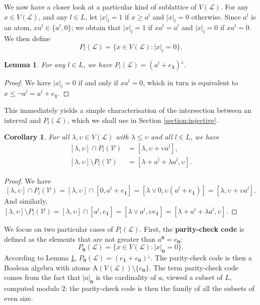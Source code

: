 \documentclass[a4paper, 11pt]{article}
\theoremstyle{plain}
\newtheorem{corollary}  [theorem]{Corollary}
\newtheorem{lemma}      [theorem]{Lemma}
\theoremstyle{definition}
\newcommand{\Define}    [1] {\textbf{#1}}
\newcommand{\join}      {\lor}
\newcommand{\zero}      {\mathbf{0}}
\newcommand{\one}       {\mathbf{1}}
\newcommand{\Atoms}     {\mathrm{A}}
\begin{document}
We now have a closer look at a particular kind of sublattice of $V( \mathcal{L} )$. For any $x \in V( \mathcal{L} )$, and any $l \in L$, let $|x|_l = 1$ if $x \ge a^l$ and $|x|_l = 0$ otherwise. Since $a^l$ is an atom, $x a^l \in \{ a^l, 0 \}$; we obtain that $|x|_l =1$ if $xa^l = a^l$ and $|x|_l = 0$ if $x a^l = 0$. We then define
\[
    P_l( \mathcal{L} ) = \{ x \in V( \mathcal{L} ) : |x|_l = 0 \}.
\]

\begin{lemma} \label{lemma:Pl}
For any $l \in L$, we have $P_l( \mathcal{L} ) = ( a^l + e_\one )^\downarrow$.
\end{lemma}

\begin{proof}
We have $|x|_l = 0$ if and only if $x a^l = 0$, which in turn is equivalent to $x \le \neg a^l = a^l + e_\one$.
\end{proof}

This immediately yields a simple characterisation of the intersection between an interval and $P_l( \mathcal{L} )$, which we shall use in Section \ref{section:injective}.

\begin{corollary} \label{corollary:Pl}
For all $\lambda, \upsilon \in V(\mathcal{L})$ with $\lambda \le \upsilon$ and all $l \in L$, we have
\begin{align}
    \label{equation:P1a}
    [ \lambda, \upsilon ] \cap P_l( \mathcal{V} ) &= [ \lambda, \upsilon + \upsilon a^l ], \\
    \label{equation:P1b}
    [ \lambda, \upsilon ] \setminus P_l( \mathcal{V} ) &= [ \lambda + a^l + \lambda a^l, \upsilon ].
\end{align}
\end{corollary}

\begin{proof}
We have
\[
    [ \lambda, \upsilon ] \cap P_l( \mathcal{V} ) = [ \lambda, \upsilon ] \cap [ 0, a^l + e_\one ] 
    = [ \lambda \join 0, \upsilon ( a^l + e_\one ) ] 
    = [ \lambda, \upsilon + \upsilon a^l ].
\]
And similarly, $[ \lambda, \upsilon ] \setminus P_l( \mathcal{V} ) = [ \lambda, \upsilon ] \cap [ a^l, e_\one ] = [ \lambda \join a^l, \upsilon e_\one ] = [ \lambda + a^l + \lambda a^l, \upsilon]$.

\end{proof}

We focus on two particular cases of $P_l( \mathcal{L} )$. First, the \Define{parity-check code} is defined as the elements that are not greater than $a^\zero = e_\zero$:
\[
    P_\zero( \mathcal{L} ) = \{ x \in V( \mathcal{L} ) : |x|_\zero = 0 \}.
\]
According to Lemma \ref{lemma:Pl}, $P_\zero( \mathcal{L} ) = (e_\one + e_\zero)^\downarrow$. The parity-check code is then a Boolean algebra with atoms $\Atoms( V( \mathcal{L} ) ) \setminus \{ e_\zero \}$. The term parity-check code comes from the fact that $|a|_\zero$ is the cardinality of $a$, viewed a subset of $L$, computed modulo $2$: the parity-check code is then the family of all the subsets of even size. 
\end{document}
